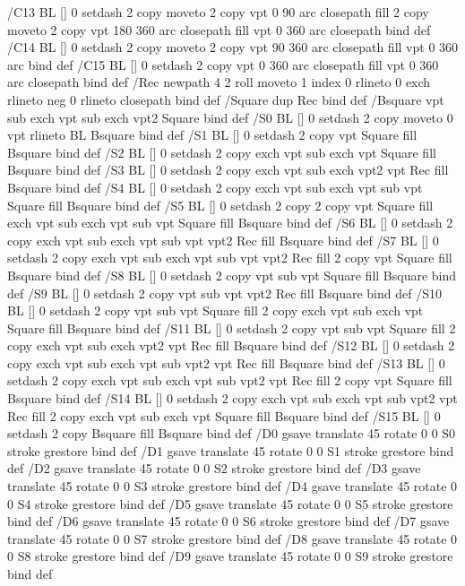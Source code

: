 /C13 {BL [] 0 setdash 2 copy moveto
	2 copy vpt 0 90 arc closepath fill
	2 copy moveto
	2 copy vpt 180 360 arc closepath fill
	vpt 0 360 arc closepath} bind def
/C14 {BL [] 0 setdash 2 copy moveto
	2 copy vpt 90 360 arc closepath fill
	vpt 0 360 arc} bind def
/C15 {BL [] 0 setdash 2 copy vpt 0 360 arc closepath fill
	vpt 0 360 arc closepath} bind def
/Rec {newpath 4 2 roll moveto 1 index 0 rlineto 0 exch rlineto
	neg 0 rlineto closepath} bind def
/Square {dup Rec} bind def
/Bsquare {vpt sub exch vpt sub exch vpt2 Square} bind def
/S0 {BL [] 0 setdash 2 copy moveto 0 vpt rlineto BL Bsquare} bind def
/S1 {BL [] 0 setdash 2 copy vpt Square fill Bsquare} bind def
/S2 {BL [] 0 setdash 2 copy exch vpt sub exch vpt Square fill Bsquare} bind def
/S3 {BL [] 0 setdash 2 copy exch vpt sub exch vpt2 vpt Rec fill Bsquare} bind def
/S4 {BL [] 0 setdash 2 copy exch vpt sub exch vpt sub vpt Square fill Bsquare} bind def
/S5 {BL [] 0 setdash 2 copy 2 copy vpt Square fill
	exch vpt sub exch vpt sub vpt Square fill Bsquare} bind def
/S6 {BL [] 0 setdash 2 copy exch vpt sub exch vpt sub vpt vpt2 Rec fill Bsquare} bind def
/S7 {BL [] 0 setdash 2 copy exch vpt sub exch vpt sub vpt vpt2 Rec fill
	2 copy vpt Square fill Bsquare} bind def
/S8 {BL [] 0 setdash 2 copy vpt sub vpt Square fill Bsquare} bind def
/S9 {BL [] 0 setdash 2 copy vpt sub vpt vpt2 Rec fill Bsquare} bind def
/S10 {BL [] 0 setdash 2 copy vpt sub vpt Square fill 2 copy exch vpt sub exch vpt Square fill
	Bsquare} bind def
/S11 {BL [] 0 setdash 2 copy vpt sub vpt Square fill 2 copy exch vpt sub exch vpt2 vpt Rec fill
	Bsquare} bind def
/S12 {BL [] 0 setdash 2 copy exch vpt sub exch vpt sub vpt2 vpt Rec fill Bsquare} bind def
/S13 {BL [] 0 setdash 2 copy exch vpt sub exch vpt sub vpt2 vpt Rec fill
	2 copy vpt Square fill Bsquare} bind def
/S14 {BL [] 0 setdash 2 copy exch vpt sub exch vpt sub vpt2 vpt Rec fill
	2 copy exch vpt sub exch vpt Square fill Bsquare} bind def
/S15 {BL [] 0 setdash 2 copy Bsquare fill Bsquare} bind def
/D0 {gsave translate 45 rotate 0 0 S0 stroke grestore} bind def
/D1 {gsave translate 45 rotate 0 0 S1 stroke grestore} bind def
/D2 {gsave translate 45 rotate 0 0 S2 stroke grestore} bind def
/D3 {gsave translate 45 rotate 0 0 S3 stroke grestore} bind def
/D4 {gsave translate 45 rotate 0 0 S4 stroke grestore} bind def
/D5 {gsave translate 45 rotate 0 0 S5 stroke grestore} bind def
/D6 {gsave translate 45 rotate 0 0 S6 stroke grestore} bind def
/D7 {gsave translate 45 rotate 0 0 S7 stroke grestore} bind def
/D8 {gsave translate 45 rotate 0 0 S8 stroke grestore} bind def
/D9 {gsave translate 45 rotate 0 0 S9 stroke grestore} bind def
